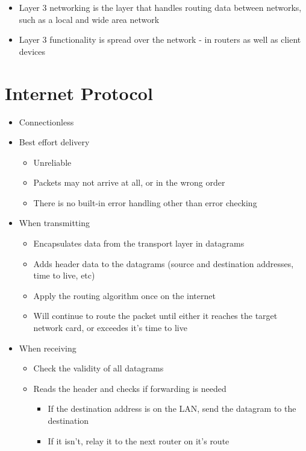 
\begin{itemize}
\item Layer 3 networking is the layer that handles routing data between networks, such as a local and wide area network
\item Layer 3 functionality is spread over the network - in routers as well as client devices
\end{itemize}

\section*{Internet Protocol}

\begin{itemize}
  \item Connectionless
  \item Best effort delivery
  \begin{itemize}
    \item Unreliable
    \item Packets may not arrive at all, or in the wrong order
    \item There is no built-in error handling other than error checking
  \end{itemize}
  \item When transmitting
  \begin{itemize}
    \item Encapsulates data from the transport layer in datagrams
    \item Adds header data to the datagrams (source and destination addresses, time to live, etc)
    \item Apply the routing algorithm once on the internet
    \item Will continue to route the packet until either it reaches the target network card, or exceedes it's time to live
  \end{itemize}
  \item When receiving
  \begin{itemize}
    \item Check the validity of all datagrams
    \item Reads the header and checks if forwarding is needed
    \begin{itemize}
      \item If the destination address is on the LAN, send the datagram to the destination
      \item If it isn't, relay it to the next router on it's route
    \end{itemize}
  \end{itemize}
\end{itemize}

